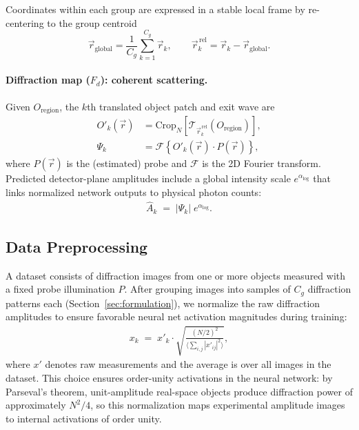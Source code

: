 \documentclass{optica-article}
\begin{document}
Coordinates within each group are expressed in a stable local frame by re-centering to the group centroid
\[
\vec{r}_{\text{global}}=\frac{1}{C_g}\sum_{k=1}^{C_g}\vec{r}_k,\qquad
\vec{r}^{\,\text{rel}}_k=\vec{r}_k-\vec{r}_{\text{global}}.
\]

\paragraph{Diffraction map ($F_d$): coherent scattering.}
Given $O_{\text{region}}$, the $k$th translated object patch and exit wave are
\begin{align}
  O'_k(\vec{r}) &= \mathrm{Crop}_N\!\left[\mathcal{T}_{\vec{r}^{\,\text{rel}}_k}\!\left(O_{\text{region}}\right)\right], \\
  \Psi_k &= \mathcal{F}\!\left\{ O'_k(\vec{r}) \cdot P(\vec{r}) \right\},
\end{align}
where $P(\vec{r})$ is the (estimated) probe and $\mathcal{F}$ is the 2D Fourier transform. Predicted detector-plane amplitudes include a global intensity scale $e^{\alpha_{\log}}$ that links normalized network outputs to physical photon counts:
\begin{align}
  \hat{A}_k \;=\; |\Psi_k|\; e^{\alpha_{\log}}.
\end{align}

\subsection{Data Preprocessing}
\label{sec:preprocess}

A dataset consists of diffraction images from one or more objects measured with a fixed probe illumination $P$. After grouping images into samples of $C_g$ diffraction patterns each (Section~\ref{sec:formulation}), we normalize the raw diffraction amplitudes to ensure favorable neural net activation magnitudes during training:
\begin{align}
  x_k \;=\; x'_k \cdot \sqrt{\frac{(N/2)^2}{\big\langle\sum_{i,j} |x'_{ij}|^2\big\rangle}},
  \label{eq:norm}
\end{align}
where $x'$ denotes raw measurements and the average is over all images in the dataset. This choice ensures order-unity activations in the neural network: by Parseval's theorem, unit-amplitude real-space objects produce diffraction power of approximately $N^2/4$, so this normalization maps experimental amplitude images to internal activations of order unity.
\end{document}
